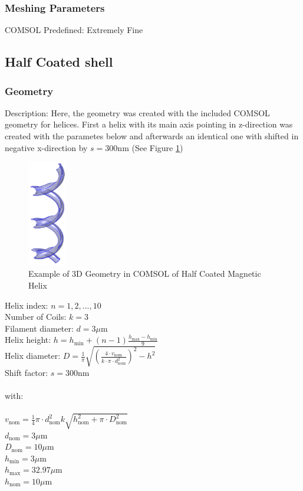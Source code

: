 \subsubsection{Meshing Parameters}
COMSOL Predefined: Extremely Fine

\subsection{Half Coated shell}
\subsubsection{Geometry}

Description: Here, the geometry was created with the included COMSOL geometry for helices. First a helix with its main axis pointing in z-direction was created with the parametes below and afterwards an identical one with shifted in negative x-direction by $s = 300$nm (See Figure \ref{fig:COMSOLhalf})

\begin{figure}[ht]
	\centering
  \includegraphics[width=0.15\textwidth]{Pictures/COMSOLhalf.png}
	\caption{Example of 3D Geometry in COMSOL of Half Coated Magnetic Helix}
	\label{fig:COMSOLhalf}
\end{figure}

Helix index: $n = 1,2,...,10$\\
Number of Coils: $k = 3$\\
Filament diameter: $d =  3\mu$m\\
Helix height: $h = h_\text{min} + (n -1)\frac{h_\text{max}-h_\text{min}}{9}$\\
Helix diameter: $D = \frac{1}{\pi}\sqrt{\left(\frac{4\cdot v_\text{nom}}{k\cdot \pi \cdot d_\text{nom}^2}\right)^2 - h^2}$\\
Shift factor: $s = 300$nm\\\\
with:\\\\
$v_\text{nom} = \frac{1}{4}\pi \cdot d_\text{nom}^2 k \sqrt{h_\text{nom}^2+\pi\cdot D_\text{nom}^2} $\\
$d_\text{nom} = 3\mu$m\\
$D_\text{nom} = 10\mu$m\\
$h_\text{min} = 3\mu$m\\
$h_\text{max} = 32.97\mu$m\\
$h_\text{nom} = 10\mu$m

